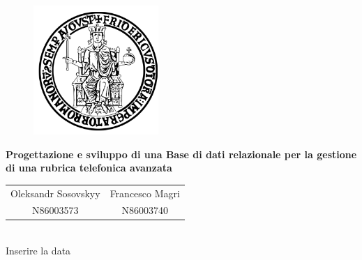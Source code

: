 \documentclass[a4paper,11pt]{report}
\begin{document}
\begin{figure}[htbp!]
\begin{center}
\includegraphics[width=.35\textwidth]{Immagini/FedericoII.png}
\end{center}
\end{figure}

\begin{center}
{\Huge\bfseries\noindent 
Progettazione e sviluppo di una Base di dati relazionale per la gestione di una rubrica telefonica avanzata}
\end{center}  
    
\begin{center}
\begin{tabular}{cc}
Oleksandr Sosovskyy & Francesco Magri \\
N86003573 & N86003740 \\
\end{tabular}
\\
Inserire la data
\end{center}

\newpage

\tableofcontents
    



\end{document}
